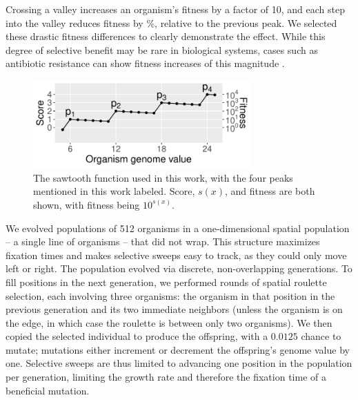 Crossing a valley increases an organism's fitness by a factor of 10, and each step into the valley reduces fitness by \%, relative to the previous peak. %
We selected these drastic fitness differences to clearly demonstrate the effect.%
While this degree of selective benefit may be rare in biological systems, cases such as antibiotic resistance can show fitness increases of this magnitude \citep{gullbergSelectionResistantBacteria2011}.

\begin{figure}[h!]
\begin{center}
\includegraphics[width=0.75\textwidth]{05_adaptive_momentum/media/sawtooth_conceptual_figure.pdf}
\caption{
    The sawtooth function used in this work, with the four peaks mentioned in this work labeled.
    Score, $s(x)$, and fitness are both shown, with fitness being $10^{s(x)}$.
}
\label{fig-sawtooth}
\end{center}
\end{figure}

We evolved populations of 512 organisms in a one-dimensional spatial population -- a single line of organisms -- that did not wrap. 
This structure maximizes fixation times and makes selective sweeps easy to track, as they could only move left or right.
The population evolved via discrete, non-overlapping generations. 
To fill positions in the next generation, we performed rounds of spatial roulette selection, each involving three organisms: the organism in that position in the previous generation and its two immediate neighbors (unless the organism is on the edge, in which case the roulette is between only two organisms). 
We then copied the selected individual to produce the offspring, with a $0.0125$ chance to mutate; mutations either increment or decrement the offspring's genome value by one. 
Selective sweeps are thus limited to advancing one position in the population per generation, limiting the growth rate and therefore the fixation time of a beneficial mutation. 

